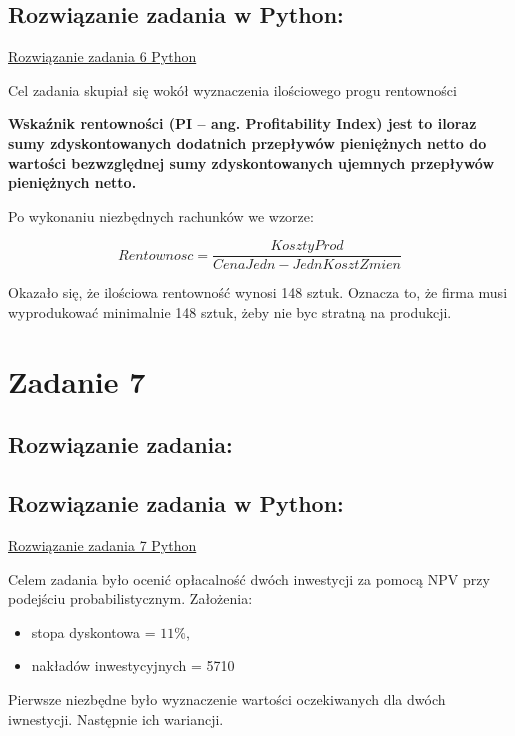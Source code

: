 \documentclass{article}
\begin{document}
	
	\subsection*{Rozwiązanie zadania w Python:}
	\href{https://github.com/slaw999999999/OEI/blob/main/Zadanie1.ipynb}{Rozwiązanie zadania 6 Python}
	
	
	 Cel zadania skupiał się wokół wyznaczenia ilościowego progu rentowności \newline
	 	 
	 \textbf{Wskaźnik rentowności (PI – ang. Profitability Index) jest to iloraz sumy zdyskontowanych dodatnich
	 	przepływów pieniężnych netto do wartości bezwzględnej sumy zdyskontowanych ujemnych przepływów
	 	pieniężnych netto.}\newline
 	
  	Po wykonaniu niezbędnych rachunków we wzorze:
  	
  		$$Rentownosc = \frac{KosztyProd}{CenaJedn-JednKosztZmien} $$
  		
  	Okazało się, że ilościowa rentowność wynosi 148 sztuk. Oznacza to, że firma musi wyprodukować minimalnie 148 sztuk, żeby nie byc stratną na produkcji.
 	
 	
	\newpage
	\section*{Zadanie 7}
	
	
	\subsection*{Rozwiązanie zadania:}
	
	
	\subsection*{Rozwiązanie zadania w Python:}
	\href{https://github.com/slaw999999999/OEI/blob/main/Zadanie1.ipynb}{Rozwiązanie zadania 7 Python}
	
	Celem zadania było ocenić opłacalność dwóch inwestycji za pomocą NPV przy podejściu probabilistycznym. Założenia:
	\begin{itemize}
		\item 
		stopa
		dyskontowa = 
		$11 \%$,
		
		\item 
		nakładów inwestycyjnych =  5710
	\end{itemize}
		
		Pierwsze niezbędne było wyznaczenie wartości oczekiwanych dla dwóch iwnestycji. Następnie ich wariancji.
		
\end{document}
